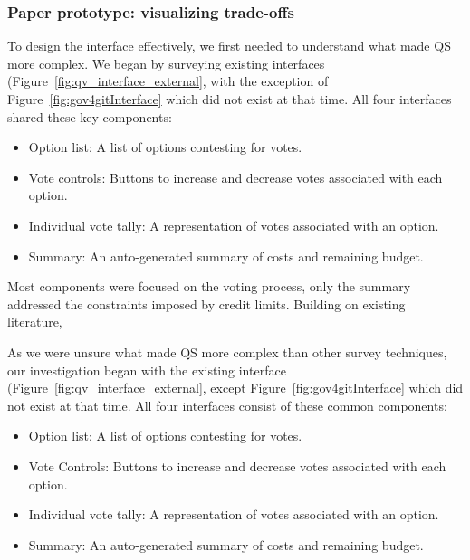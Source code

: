 \subsubsection{Paper prototype: visualizing trade-offs}
To design the interface effectively, we first needed to understand what made QS more complex. We began by surveying existing interfaces (Figure~\ref{fig:qv_interface_external}, with the exception of Figure~\ref{fig:gov4gitInterface} which did not exist at that time. All four interfaces shared these key components:
\begin{itemize}
    \item Option list: A list of options contesting for votes.
    \item Vote controls: Buttons to increase and decrease votes associated with each option.
    \item Individual vote tally: A representation of votes associated with an option.
    \item Summary: An auto-generated summary of costs and remaining budget.
\end{itemize}

Most components were focused on the voting process, only the summary addressed the constraints imposed by credit limits. Building on existing literature, 


As we were unsure what made QS more complex than other survey techniques, our investigation began with the existing interface (Figure~\ref{fig:qv_interface_external}, except Figure~\ref{fig:gov4gitInterface} which did not exist at that time. All four interfaces consist of these common components:
\begin{itemize}
    \item Option list: A list of options contesting for votes.
    \item Vote Controls: Buttons to increase and decrease votes associated with each option.
    \item Individual vote tally: A representation of votes associated with an option.
    \item Summary: An auto-generated summary of costs and remaining budget.
\end{itemize}

